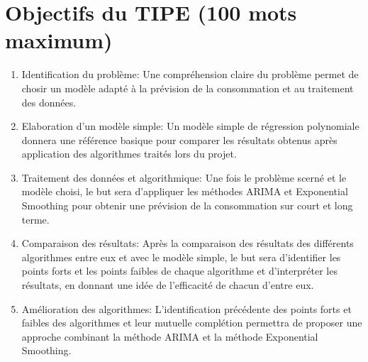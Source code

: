 \documentclass[12pt,a4paper]{article}
\begin{document}
\section*{Objectifs du TIPE (100 mots maximum)}
\begin{enumerate}
    \item   Identification du problème: Une compréhension claire du problème permet de chosir un modèle adapté à la prévision de la consommation et au traitement des données.

    \item   Elaboration d'un modèle simple: Un modèle simple de régression polynomiale donnera une référence basique pour comparer les résultats obtenus après application des algorithmes traités lors du projet.
	
    \item   Traitement des données et algorithmique: Une fois le problème scerné et le modèle choisi, le but sera d'appliquer les méthodes ARIMA et Exponential Smoothing pour obtenir une prévision de la consommation sur court et long terme.
    
    \item	Comparaison des résultats: Après la comparaison des résultats des différents algorithmes entre eux et avec le modèle simple, le but sera d'identifier les points forts et les points faibles de chaque algorithme et d'interpréter les résultats, en donnant une idée de l'efficacité de chacun d'entre eux.
    
    \item   Amélioration des algorithmes: L'identification précédente des points forts et faibles des algorithmes et leur mutuelle complétion permettra de proposer une approche combinant la méthode ARIMA et la méthode Exponential Smoothing.
\end{enumerate}
\end{document}
